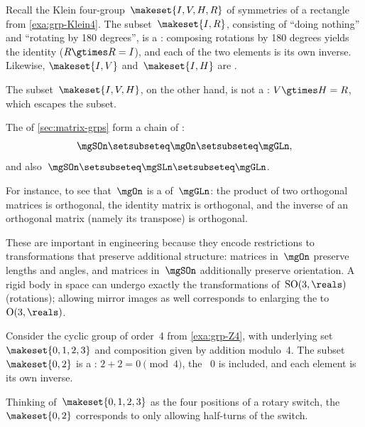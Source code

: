 \begin{example}
    Recall the Klein four-group~$\makeset{I, V, H, R}$ of symmetries of a rectangle from \cref{exa:grp-Klein4}.
    The subset~$\makeset{I, R}$, consisting of ``doing nothing'' and ``rotating by 180 degrees'', is a : composing rotations by 180 degrees yields the identity ($R \gtimes R = I$), and each of the two elements is its own inverse.
    Likewise, $\makeset{I, V}$ and~$\makeset{I, H}$ are .

    The subset~$\makeset{I, V, H}$, on the other hand, is not a : $V \gtimes H = R$, which escapes the subset.
\end{example}

\begin{example}
    \label{exa:matrix-subgroups}
    The  of \cref{sec:matrix-grps} form a chain of :
    \begin{equation}
        \mgSOn \setsubseteq \mgOn \setsubseteq \mgGLn ,
    \end{equation}
    and also~$\mgSOn \setsubseteq \mgSLn \setsubseteq \mgGLn$.

    For instance, to see that~$\mgOn$ is a  of~$\mgGLn$: the product of two orthogonal matrices is orthogonal, the identity matrix is orthogonal, and the inverse of an orthogonal matrix (namely its transpose) is orthogonal.

    These  are important in engineering because they encode restrictions to transformations that preserve additional structure: matrices in~$\mgOn$ preserve lengths and angles, and matrices in~$\mgSOn$ additionally preserve orientation.
    A rigid body in space can undergo exactly the transformations of~$\mathrm{SO}(3, \reals)$ (rotations); allowing mirror images as well corresponds to enlarging the  to~$\mathrm{O}(3, \reals)$.
\end{example}

\begin{example}
    Consider the cyclic group of order~4 from \cref{exa:grp-Z4}, with underlying set~$\makeset{0,1,2,3}$ and composition given by addition modulo~4.
    The subset~$\makeset{0, 2}$ is a : $2 + 2 = 0 \pmod 4$, the ~$0$ is included, and each element is its own inverse.

    Thinking of~$\makeset{0,1,2,3}$ as the four positions of a rotary switch, the ~$\makeset{0,2}$ corresponds to only allowing half-turns of the switch.
\end{example}

